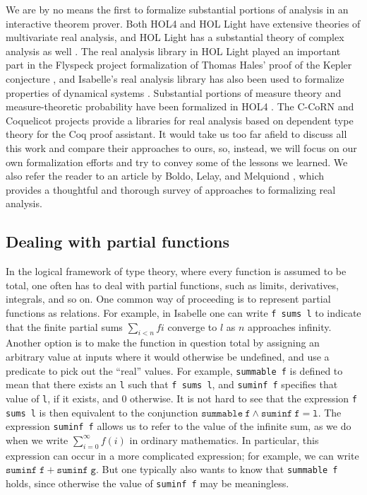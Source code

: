 \documentclass{svjour3}
\begin{document}
We are by no means the first to formalize substantial portions of analysis in an interactive theorem prover. Both HOL4 and HOL Light have extensive theories of multivariate real analysis, and HOL Light has a substantial theory of complex analysis as well \cite{harrison:07a}. The real analysis library in HOL Light played an important part in the Flyspeck project formalization of Thomas Hales' proof of the Kepler conjecture \cite{hales:et:al:15}, and Isabelle's real analysis library has also been used to formalize properties of dynamical systems \cite{immler:traut:16}. Substantial portions of measure theory and measure-theoretic probability have been formalized in HOL4 \cite{mhamdi:et:al:11,qasim:et:al:16}. The C-CoRN and Coquelicot projects \cite{krebbers:spitters:11,boldo:et:al:12} provide a libraries for real analysis based on dependent type theory for the Coq proof assistant. It would take us too far afield to discuss all this work and compare their approaches to ours, so, instead, we will focus on our own formalization efforts and try to convey some of the lessons we learned. We also refer the reader to an article by Boldo, Lelay, and Melquiond \cite{boldo:et:al:16}, which provides a thoughtful and thorough survey of approaches to formalizing real analysis.

\subsection{Dealing with partial functions}
\label{subsection:partial}

In the logical framework of type theory, where every function is assumed to be total, one often has to deal with partial functions, such as limits, derivatives, integrals, and so on. One common way of proceeding is to represent partial functions as relations. For example, in Isabelle one can write \texttt{f~sums~l} to indicate that the finite partial sums $\sum_{i < n} f i$ converge to $l$ as $n$ approaches infinity. Another option is to make the function in question total by assigning an arbitrary value at inputs where it would otherwise be undefined, and use a predicate to pick out the ``real'' values. For example, \texttt{summable f} is defined to mean that there exists an \texttt{l} such that \texttt{f sums l}, and \texttt{suminf f} specifies that value of \texttt{l}, if it exists, and $0$ otherwise. It is not hard to see that the expression \texttt{f sums l} is then equivalent to the conjunction $\mathtt{summable~f} \wedge \mathtt{suminf~f } = \mathtt{l}$. The expression \texttt{suminf f} allows us to refer to the value of the infinite sum, as we do when we write $\sum_{i = 0}^\infty f(i)$ in ordinary mathematics. In particular, this expression can occur in a more complicated expression; for example, we can write $\mathtt{suminf \; f} + \mathtt{suminf \; g}$. But one typically also wants to know that \texttt{summable f} holds, since otherwise the value of \texttt{suminf f} may be meaningless.
\end{document}
